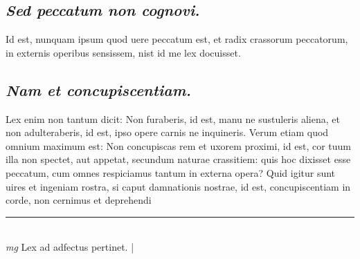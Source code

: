 \documentclass{article}
\begin{document}
\begin{pages}
\subsection*{\textit{Sed peccatum non cognovi. }}\pstart Id est, nunquam ipsum quod uere peccatum est, et radix crassorum peccatorum, in externis operibus sensissem, nist id me lex docuisset.   \pend
{}
{}
\subsection*{\textit{Nam et concupiscentiam. }}\pstart Lex enim non tantum dicit: Non furaberis, id est, manu ne sustuleris aliena, et non adulteraberis, id est, ipso opere carnis ne inquineris. Verum etiam quod omnium maximum est: Non concupiscas rem et uxorem proximi, id est, cor tuum illa non spectet, aut appetat, secundum naturae crassitiem: quis hoc dixisset esse peccatum, cum omnes respiciamus tantum in externa opera? Quid igitur sunt uires et ingeniam rostra, si caput damnationis nostrae, id est, concupiscentiam in corde, non cernimus et deprehendi\pend
\vspace{0.5cm}\noindent
\vspace{0.2cm}\rule{1cm}{0.2pt}\\ 
\hspace{0.2cm}\textit{mg}
\footnotesize Lex ad adfectus pertinet.  
\normalsize| 

\end{pages}
\end{document}
